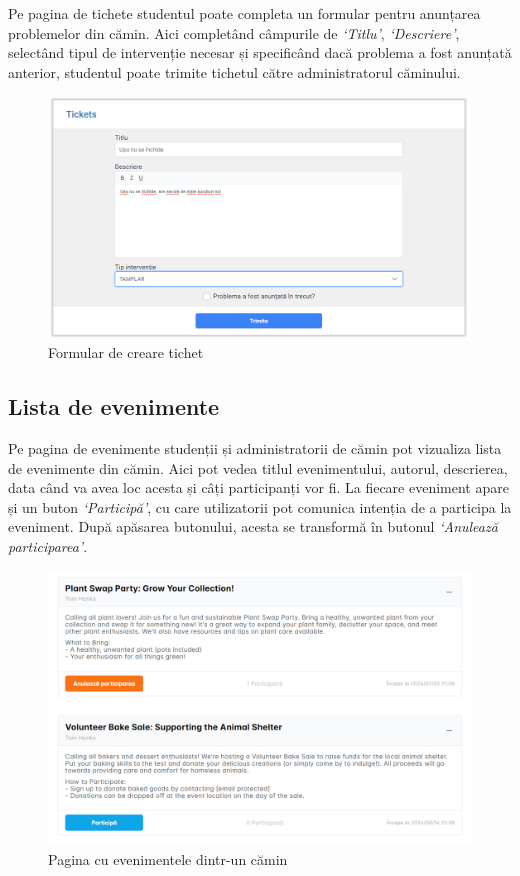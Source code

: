\documentclass[12pt,a4paper]{report}
\theoremstyle{definition}
\theoremstyle{remark}
\begin{document}
\par Pe pagina de tichete studentul poate completa un formular pentru anunțarea problemelor din cămin. Aici completând câmpurile de \textit{`Titlu'}, \textit{`Descriere'}, selectând tipul de intervenție necesar și specificând dacă problema a fost anunțată anterior, studentul poate trimite tichetul către administratorul căminului.


\begin{figure}[H]
    \centering
    \includegraphics[width=0.8\linewidth]{resurse/ghid_utilizare/creare_tichet.png}
    \caption{Formular de creare tichet}
\end{figure}

\subsection{Lista de evenimente}

\par Pe pagina de evenimente studenții și administratorii de cămin pot vizualiza lista de evenimente din cămin. Aici pot vedea titlul evenimentului, autorul, descrierea, data când va avea loc acesta și câți participanți vor fi. La fiecare eveniment apare și un buton \textit{`Participă'}, cu care utilizatorii pot comunica intenția de a participa la eveniment. După apăsarea butonului, acesta se transformă în butonul \textit{`Anulează participarea'}.


\begin{figure}[H]
    \centering
    \includegraphics[width=0.8\linewidth]{resurse/ghid_utilizare/events.png}
    \caption{Pagina cu evenimentele dintr-un cămin}
\end{figure}
\end{document}
